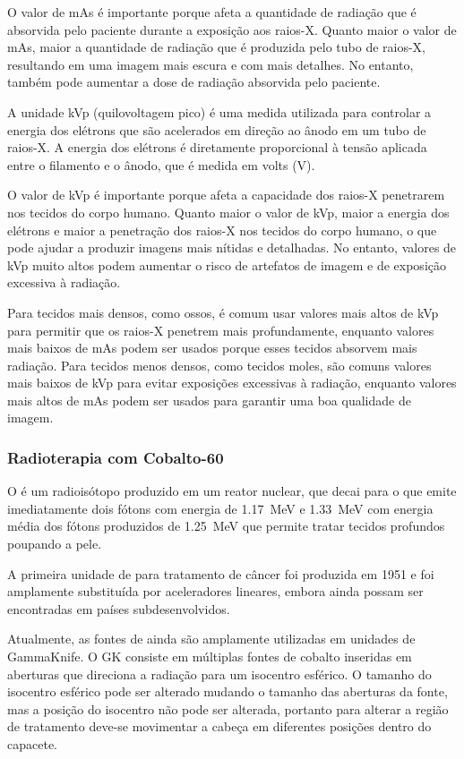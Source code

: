 \documentclass[11pt,a4paper]{article}
\begin{document}
    O valor de mAs é importante porque afeta a quantidade de radiação que é absorvida pelo paciente durante a exposição aos raios-X. Quanto maior o valor de mAs, maior a quantidade de radiação que é produzida pelo tubo de raios-X, resultando em uma imagem mais escura e com mais detalhes. No entanto, também pode aumentar a dose de radiação absorvida pelo paciente.

    A unidade kVp (quilovoltagem pico) é uma medida utilizada para controlar a energia dos elétrons que são acelerados em direção ao ânodo em um tubo de raios-X. A energia dos elétrons é diretamente proporcional à tensão aplicada entre o filamento e o ânodo, que é medida em volts (V).

    O valor de kVp é importante porque afeta a capacidade dos raios-X penetrarem nos tecidos do corpo humano. Quanto maior o valor de kVp, maior a energia dos elétrons e maior a penetração dos raios-X nos tecidos do corpo humano, o que pode ajudar a produzir imagens mais nítidas e detalhadas. No entanto, valores de kVp muito altos podem aumentar o risco de artefatos de imagem e de exposição excessiva à radiação.

    Para tecidos mais densos, como ossos, é comum usar valores mais altos de kVp para permitir que os raios-X penetrem mais profundamente, enquanto valores mais baixos de mAs podem ser usados porque esses tecidos absorvem mais radiação. Para tecidos menos densos, como tecidos moles, são comuns valores mais baixos de kVp para evitar exposições excessivas à radiação, enquanto valores mais altos de mAs podem ser usados para garantir uma boa qualidade de imagem.


\subsubsection*{Radioterapia com Cobalto-60}

    O  é um radioisótopo produzido em um reator nuclear, que decai para o  que emite imediatamente dois fótons com energia de \qty{1.17}{MeV} e \qty{1.33}{MeV} com energia média dos fótons produzidos de \qty{1.25}{MeV} que permite tratar tecidos profundos poupando a pele.
                
    A primeira unidade de  para tratamento de câncer foi produzida em 1951 e foi amplamente substituída por aceleradores lineares, embora ainda possam ser encontradas em países subdesenvolvidos.

     Atualmente, as fontes de  ainda são amplamente utilizadas em unidades de GammaKnife. O GK consiste em múltiplas fontes de cobalto inseridas em aberturas que direciona a radiação para um isocentro esférico. O tamanho do isocentro esférico pode ser alterado mudando o tamanho das aberturas da fonte, mas a posição do isocentro não pode ser alterada, portanto para alterar a região de tratamento deve-se movimentar a cabeça em diferentes posições dentro do capacete.
\end{document}
